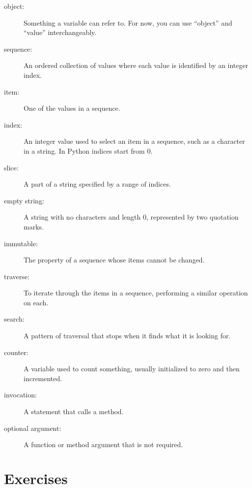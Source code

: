 \documentclass[10pt]{book}
\begin{document}
\begin{description}

\item[object:] Something a variable can refer to.  For now,
you can use ``object'' and ``value'' interchangeably.

\item[sequence:] An ordered collection of
values where each value is identified by an integer index.

\item[item:] One of the values in a sequence.

\item[index:] An integer value used to select an item in
a sequence, such as a character in a string.  In Python
indices start from 0.

\item[slice:] A part of a string specified by a range of indices.

\item[empty string:] A string with no characters and length 0, represented
by two quotation marks.

\item[immutable:] The property of a sequence whose items cannot
be changed.

\item[traverse:] To iterate through the items in a sequence,
performing a similar operation on each.

\item[search:] A pattern of traversal that stops
when it finds what it is looking for.

\item[counter:] A variable used to count something, usually initialized
to zero and then incremented.

\item[invocation:] A statement that calls a method.

\item[optional argument:] A function or method argument that is not
required.

\end{description}


\section{Exercises}
\end{document}
